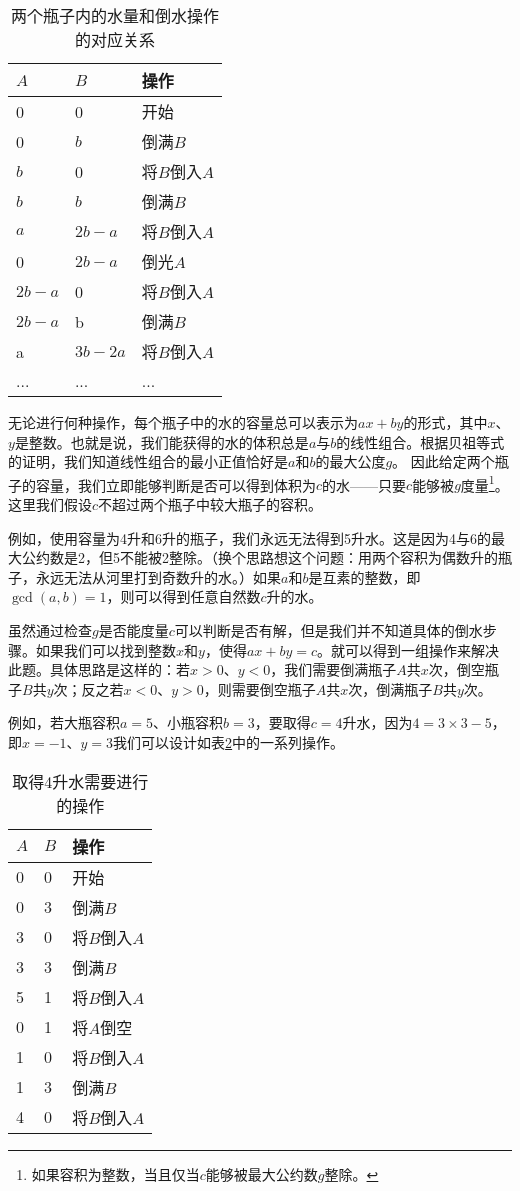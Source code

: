 \documentclass[b5paper]{ctexart}
\begin{document}
\begin{table}[htbp]
\centering
\begin{tabular}{l|l|l}
$A$ & $B$ & 操作 \\
\hline
0 & 0 & 开始 \\
0 & $b$ & 倒满$B$ \\
$b$ & 0 & 将$B$倒入$A$ \\
$b$ & $b$ & 倒满$B$ \\
$a$ & $2b - a$ & 将$B$倒入$A$ \\
0 & $2b - a$ & 倒光$A$ \\
$2b - a$ & 0 & 将$B$倒入$A$ \\
$2b - a$ & b & 倒满$B$ \\
a & $3b - 2a$ & 将$B$倒入$A$ \\
... & ... & ... \\
\end{tabular}
\caption{两个瓶子内的水量和倒水操作的对应关系} \label{tab:jug-ops}
\end{table}

无论进行何种操作，每个瓶子中的水的容量总可以表示为$ax + by$的形式，其中$x$、$y$是整数。也就是说，我们能获得的水的体积总是$a$与$b$的线性组合。根据贝祖等式的证明，我们知道线性组合的最小正值恰好是$a$和$b$的最大公度$g$。
因此给定两个瓶子的容量，我们立即能够判断是否可以得到体积为$c$的水——只要$c$能够被$g$度量\footnote{如果容积为整数，当且仅当$c$能够被最大公约数$g$整除。}。这里我们假设$c$不超过两个瓶子中较大瓶子的容积。

例如，使用容量为4升和6升的瓶子，我们永远无法得到5升水。这是因为4与6的最大公约数是2，但5不能被2整除。（换个思路想这个问题：用两个容积为偶数升的瓶子，永远无法从河里打到奇数升的水。）如果$a$和$b$是互素的整数，即$\gcd(a, b) = 1$，则可以得到任意自然数$c$升的水。

虽然通过检查$g$是否能度量$c$可以判断是否有解，但是我们并不知道具体的倒水步骤。如果我们可以找到整数$x$和$y$，使得$ax + by = c$。就可以得到一组操作来解决此题。具体思路是这样的：若$x > 0$、$y < 0$，我们需要倒满瓶子$A$共$x$次，倒空瓶子$B$共$y$次；反之若$x < 0$、$y > 0$，则需要倒空瓶子$A$共$x$次，倒满瓶子$B$共$y$次。

例如，若大瓶容积$a=5$、小瓶容积$b=3$，要取得$c=4$升水，因为$4 = 3 \times 3 - 5$，即$x = -1$、$y = 3$我们可以设计如表\ref{tab:designed-jugs-ops}中的一系列操作。

\begin{table}[htbp]
\centering
\begin{tabular}{l|l|l}
$A$ & $B$ & 操作 \\
\hline
0 & 0 & 开始 \\
0 & 3 & 倒满$B$ \\
3 & 0 & 将$B$倒入$A$ \\
3 & 3 & 倒满$B$ \\
5 & 1 & 将$B$倒入$A$ \\
0 & 1 & 将$A$倒空 \\
1 & 0 & 将$B$倒入$A$ \\
1 & 3 & 倒满$B$ \\
4 & 0 & 将$B$倒入$A$ \\
\end{tabular}
\caption{取得4升水需要进行的操作} \label{tab:designed-jugs-ops}
\end{table}
\end{document}
